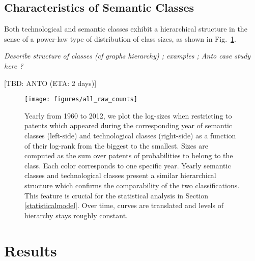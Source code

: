 \documentclass[10pt,A4]{article}
\begin{document}
\subsection{Characteristics of Semantic Classes}




Both technological and semantic classes exhibit a hierarchical structure in the sense of a power-law type of distribution of class sizes, as shown in Fig.~\ref{fig:class-sizes}.



\textit{Describe structure of classes (cf graphs hierarchy) ; examples ; Anto case study here ?}

[TBD: ANTO (ETA: 2 days)]




\begin{figure}
\centering
\hspace*{-2.5cm}
\texttt{[image: figures/all\_raw\_counts]}
\caption{Yearly from 1960 to 2012, we plot the log-sizes when restricting to patents which appeared during the corresponding year of semantic classes (left-side) and technological classes (right-side) as a function of their log-rank from the biggest to the smallest. Sizes are computed as the sum over patents of probabilities to belong to the class. Each color corresponds to one specific year. Yearly semantic classes and technological classes present a similar hierarchical structure which confirms the comparability of the two classifications. This feature is crucial for the statistical analysis in Section \ref{statisticalmodel}. Over time, curves are translated and levels of hierarchy stays roughly constant. 
}
\label{fig:class-sizes}
\end{figure}






\section{Results \label{result}}
\end{document}

